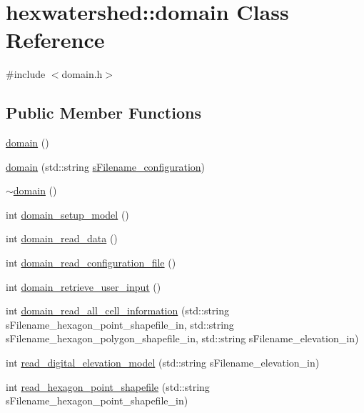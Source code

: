 \hypertarget{classhexwatershed_1_1domain}{\section{hexwatershed\-:\-:domain Class Reference}
\label{classhexwatershed_1_1domain}
}


{\ttfamily \#include $<$domain.\-h$>$}

\subsection*{Public Member Functions}
\begin{DoxyCompactItemize}
\item 
\hyperlink{classhexwatershed_1_1domain_a846191a00bd00509ebac0a0c832f7c6e}{domain} ()
\item 
\hyperlink{classhexwatershed_1_1domain_a32bb46cf3d4cb241072e6b6379196aa1}{domain} (std\-::string \hyperlink{classhexwatershed_1_1domain_a237356c07d7d19526bc78884cc8e7dc1}{s\-Filename\-\_\-configuration})
\item 
\hyperlink{classhexwatershed_1_1domain_a2801120e16364dba8bf2e17ba7615e2b}{$\sim$domain} ()
\item 
int \hyperlink{classhexwatershed_1_1domain_a48c7d4b2101d8a7e385f73c6ba4b5561}{domain\-\_\-setup\-\_\-model} ()
\item 
int \hyperlink{classhexwatershed_1_1domain_a66322aa4de2d4fec92791117648778ff}{domain\-\_\-read\-\_\-data} ()
\item 
int \hyperlink{classhexwatershed_1_1domain_a3e9019a4f1907f4d6f8f293c01231c30}{domain\-\_\-read\-\_\-configuration\-\_\-file} ()
\item 
int \hyperlink{classhexwatershed_1_1domain_a65b8a8fc2f0751aecdadf0cb9e046e96}{domain\-\_\-retrieve\-\_\-user\-\_\-input} ()
\item 
int \hyperlink{classhexwatershed_1_1domain_a4e57adf3f427614751e623017ba389b4}{domain\-\_\-read\-\_\-all\-\_\-cell\-\_\-information} (std\-::string s\-Filename\-\_\-hexagon\-\_\-point\-\_\-shapefile\-\_\-in, std\-::string s\-Filename\-\_\-hexagon\-\_\-polygon\-\_\-shapefile\-\_\-in, std\-::string s\-Filename\-\_\-elevation\-\_\-in)
\item 
int \hyperlink{classhexwatershed_1_1domain_aee114b17be1fb0a0fcd245653cad1272}{read\-\_\-digital\-\_\-elevation\-\_\-model} (std\-::string s\-Filename\-\_\-elevation\-\_\-in)
\item 
int \hyperlink{classhexwatershed_1_1domain_a33564ee8de427694e3e87db0c9cbbbb9}{read\-\_\-hexagon\-\_\-point\-\_\-shapefile} (std\-::string s\-Filename\-\_\-hexagon\-\_\-point\-\_\-shapefile\-\_\-in)

\end{DoxyCompactItemize}
